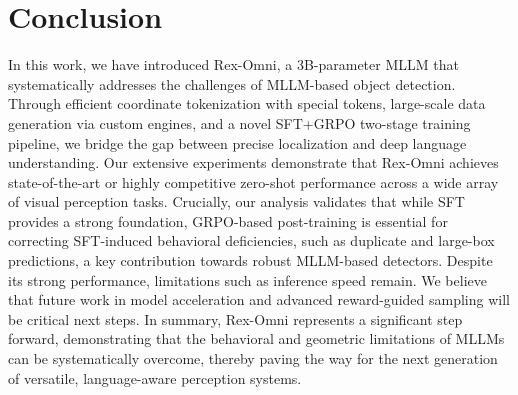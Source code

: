 \section{Conclusion}
\label{sec:Conclusion}


In this work, we have introduced Rex-Omni, a 3B-parameter MLLM that systematically addresses the challenges of MLLM-based object detection. Through efficient coordinate tokenization with special tokens, large-scale data generation via custom engines, and a novel SFT+GRPO two-stage training pipeline, we bridge the gap between precise localization and deep language understanding. Our extensive experiments demonstrate that Rex-Omni achieves state-of-the-art or highly competitive zero-shot performance across a wide array of visual perception tasks. Crucially, our analysis validates that while SFT provides a strong foundation, GRPO-based post-training is essential for correcting SFT-induced behavioral deficiencies, such as duplicate and large-box predictions, a key contribution towards robust MLLM-based detectors. Despite its strong performance, limitations such as inference speed remain. We believe that future work in model acceleration and advanced reward-guided sampling will be critical next steps. In summary, Rex-Omni represents a significant step forward, demonstrating that the behavioral and geometric limitations of MLLMs can be systematically overcome, thereby paving the way for the next generation of versatile, language-aware perception systems.